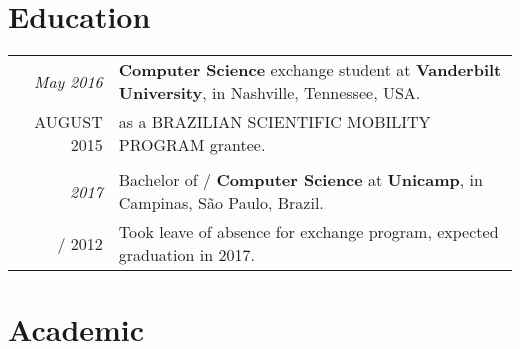 \documentclass[a4paper,10pt]{article}
\makeatletter
\def\fakesc#1{%
  \begingroup%
  \xdef\fake@name{\csname\curr@fontshape/\f@size\endcsname}%
  \fontsize{\fontdimen8\fake@name}{\baselineskip}\selectfont%
  \uppercase{#1}%
  \endgroup%
}
\renewcommand{\textsc}{\fakesc}
\makeatother
\begin{document}
\section{Education}

\begin{tabularx}{\textwidth}{r|X}

  \emph{May 2016} & \textbf{Computer Science} exchange student at \textbf{Vanderbilt University}, in Nashville, Tennessee, USA. \\
  \textsc{August 2015} & as a \textsc{Brazilian Scientific Mobility Program} grantee.  \\
  \multicolumn{2}{c}{}\\

  \emph{2017} & Bachelor of \textsc{}\textbf{Computer Science} at \textbf{Unicamp}, in Campinas, São Paulo, Brazil.\\
  \textsc{2012} & \footnotesize{Took leave of absence for exchange program, expected graduation in 2017.} \\

\end{tabularx}

\section{Academic}
\end{document}

